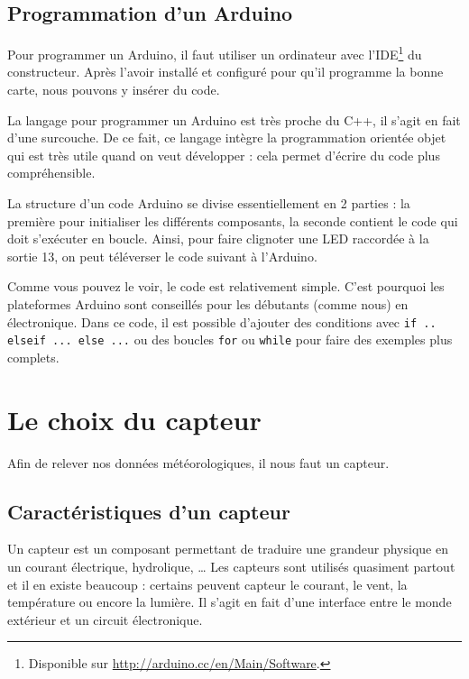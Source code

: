 \subsection{Programmation d'un Arduino}

Pour programmer un Arduino, il faut utiliser un ordinateur avec l'IDE\footnote{Disponible sur \url{http://arduino.cc/en/Main/Software}.} du constructeur. Après l'avoir installé et configuré pour qu'il programme la bonne carte, nous pouvons y insérer du code.

La langage pour programmer un Arduino est très proche du C++, il s'agit en fait d'une surcouche. De ce fait, ce langage intègre la programmation orientée objet qui est très utile quand on veut développer : cela permet d'écrire du code plus compréhensible.

La structure d'un code Arduino se divise essentiellement en 2 parties : la première pour initialiser les différents composants, la seconde contient le code qui doit s'exécuter en boucle. Ainsi, pour faire clignoter une LED raccordée à la sortie 13, on peut téléverser le code suivant à l'Arduino.


Comme vous pouvez le voir, le code est relativement simple. C'est pourquoi les plateformes Arduino sont conseillés pour les débutants (comme nous) en électronique. Dans ce code, il est possible d'ajouter des conditions avec \verb-if .. elseif ... else ...- ou des boucles \verb-for- ou \verb-while- pour faire des exemples plus complets.

\section{Le choix du capteur}

Afin de relever nos données météorologiques, il nous faut un capteur.

\subsection{Caractéristiques d'un capteur}

Un capteur est un composant permettant de traduire une grandeur physique en un courant électrique, hydrolique, \dots{} Les capteurs sont utilisés quasiment partout et il en existe beaucoup : certains peuvent capteur le courant, le vent, la température ou encore la lumière. Il s'agit en fait d'une interface entre le monde extérieur et un circuit électronique.

